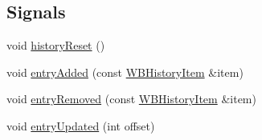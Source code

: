\subsection*{Signals}
\begin{DoxyCompactItemize}
\item 
void \hyperlink{class_w_b_history_manager_ab8ca2ee909188de7a1756d84fcf406f4}{history\-Reset} ()
\item 
void \hyperlink{class_w_b_history_manager_a47811019ca3f38969becf80093a53f40}{entry\-Added} (const \hyperlink{class_w_b_history_item}{W\-B\-History\-Item} \&item)
\item 
void \hyperlink{class_w_b_history_manager_a0a4f98730bf77d6f1b22e2d2b0cc1bb3}{entry\-Removed} (const \hyperlink{class_w_b_history_item}{W\-B\-History\-Item} \&item)
\item 
void \hyperlink{class_w_b_history_manager_aab586f70afd1f679d6064e0cb714b482}{entry\-Updated} (int offset)
\end{DoxyCompactItemize}
